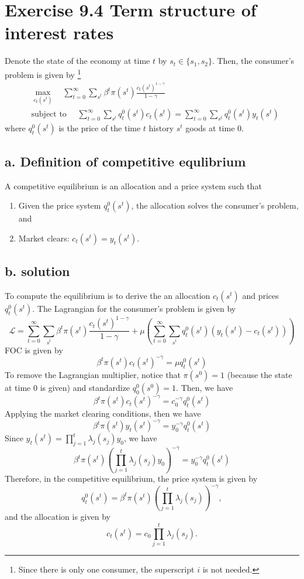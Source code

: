 \documentclass[11pt]{article}
\theoremstyle{definition}
\theoremstyle{boldtitle} %
\numberwithin{equation}{section}
\numberwithin{figure}{section}
\numberwithin{table}{section}
\begin{document}
\section{Exercise 9.4 Term structure of interest rates}
Denote the state of the economy at time $t$ by $s_t \in \{s_1, s_2 \}$.
Then, the consumer's problem is given by%
\footnote{
  Since there is only one consumer, the superscript $i$ is not needed.
}
\begin{align*}
& \max_{c_t(s^t)} \quad \sum_{t=0}^{\infty} \sum_{s^t} \beta^t \pi(s^t) \frac{c_t(s^t)^{1 - \gamma}}{1 - \gamma} \\
& \text{subject to } \quad  \sum_{t=0}^{\infty} \sum_{s^t} q^0_t(s^t) c_t (s^t) = \sum_{t=0}^{\infty} \sum_{s^t} q^0_t(s^t) y_t (s^t)
\end{align*}
where $q^0_t(s^t)$ is the price of the time $t$ history $s^t$ goods at time 0.

\subsection{a. Definition of competitive equlibrium}
A competitive equilibrium is an allocation and a price system such that 
\begin{enumerate}
  \item Given the price system $q_t^0(s^t)$, the allocation solves the consumer's problem, and
  \item Market clears: $c_t(s^t) = y_t(s^t)$.
\end{enumerate}

\subsection{b. solution}
To compute the equilibrium is to derive the an allocation $c_t(s^t)$ and prices $q^0_t(s^t)$.
The Lagrangian for the consumer's problem is given by
\[
\mathcal{L} = \sum_{t=0}^{\infty} \sum_{s^t} \beta^t \pi(s^t) \frac{c_t(s^t)^{1 - \gamma}}{1 - \gamma} 
+ \mu \left( \sum_{t=0}^{\infty} \sum_{s^t} q_t^0(s^t) (y_t(s^t) - c_t(s^t)) \right)
\]
FOC is given by 
\[
\beta^t \pi(s^t) c_t(s^t)^{- \gamma} = \mu q_t^0(s^t) 
\]
To remove the Lagrangian multiplier, notice that $\pi(s^0) = 1$ (because the state at time 0 is given)
and standardize $q_0^0(s^0) =1$.
Then, we have 
\[
\beta^t \pi(s^t) c_t(s^t)^{- \gamma} = c_0^{- \gamma} q_t^0(s^t) 
\]
Applying the market clearing conditions, then we have 
\[
\beta^t \pi(s^t) y_t(s^t)^{- \gamma} = y_0^{- \gamma} q_t^0(s^t) 
\]
Since $y_t(s^t) = \prod_{j=1}^t \lambda_j(s_j) y_0$, we have 
\[
\beta^t \pi(s^t) \left( \prod_{j=1}^t \lambda_j(s_j) y_0 \right)^{- \gamma} = y_0^{- \gamma} q_t^0(s^t) 
\]
Therefore, in the competitive equilibrium, the price system is given by 
\[
q_t^0(s^t) = \beta^t \pi(s^t) \left( \prod_{j=1}^t \lambda_j(s_j) \right)^{- \gamma},
\]
and the allocation is given by 
\[
c_t(s^t) = c_0 \prod_{j=1}^t \lambda_j(s_j).
\]
\end{document}
